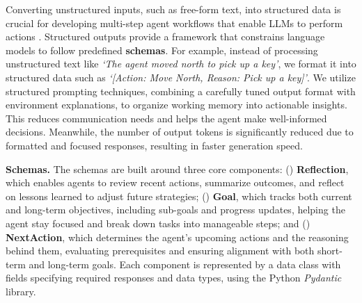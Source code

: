 Converting unstructured inputs, such as free-form text, into structured data is crucial for developing multi-step agent workflows that enable LLMs to perform actions \cite{pokrass2023structured}. Structured outputs provide a framework that constrains language models to follow predefined \textbf{schemas}. For example, instead of processing unstructured text like \textit{`The agent moved north to pick up a key'}, we format it into structured data such as \textit{`[Action: Move North, Reason: Pick up a key]'}. We utilize structured prompting techniques, combining a carefully tuned output format with environment explanations, to organize working memory into actionable insights. This reduces communication needs and helps the agent make well-informed decisions. Meanwhile, the number of output tokens is significantly reduced due to formatted and focused responses, resulting in faster generation speed.

\textbf{Schemas.} The schemas are built around three core components: () \textbf{Reflection}, which enables agents to review recent actions, summarize outcomes, and reflect on lessons learned to adjust future strategies; () \textbf{Goal}, which tracks both current and long-term objectives, including sub-goals and progress updates, helping the agent stay focused and break down tasks into manageable steps; and () \textbf{NextAction}, which determines the agent’s upcoming actions and the reasoning behind them, evaluating prerequisites and ensuring alignment with both short-term and long-term goals. Each component is represented by a data class with fields specifying required responses and data types, using the Python \textit{Pydantic} library.



